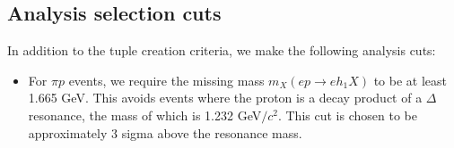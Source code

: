 \subsection{Analysis selection cuts}
\label{sec:analysis_selection}
In addition to the tuple creation criteria, we make the following analysis cuts:
\begin{itemize}
    \item For $\pi p$ events, we require the missing mass $m_{X}(ep\rightarrow eh_1X)$ to be at least 1.665 GeV.  This avoids events where the proton is a decay product of a $\Delta$ resonance, the mass of which is 1.232 GeV$/c^2$.  This cut is chosen to be approximately 3 sigma above the resonance mass.  
\end{itemize}
